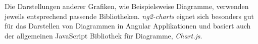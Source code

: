 Die Darstellungen anderer Grafiken, wie Beispielsweise Diagramme, verwenden jeweils entsprechend passende Bibliotheken. \emph{ng2-charts} eignet sich besonders gut für das Darstellen von Diagrammen in Angular Applikationen und basiert auch der allgemeinen JavaScript Bibliothek für Diagramme, \emph{Chart.js}. \cite{ng2-charts}